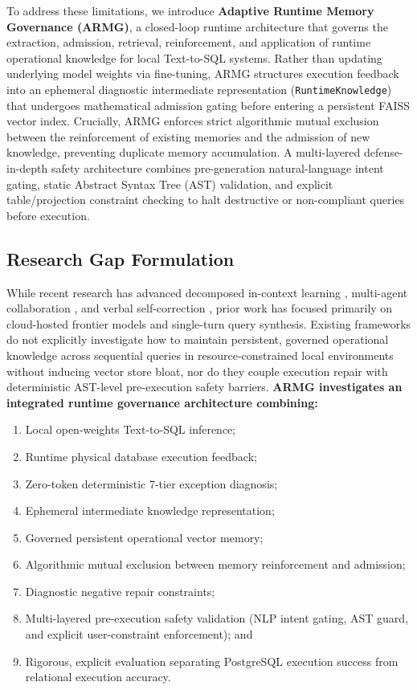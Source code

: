 \documentclass[conference]{IEEEtran}
\begin{document}
To address these limitations, we introduce \textbf{Adaptive Runtime Memory Governance (ARMG)}, a closed-loop runtime architecture that governs the extraction, admission, retrieval, reinforcement, and application of runtime operational knowledge for local Text-to-SQL systems. Rather than updating underlying model weights via fine-tuning, ARMG structures execution feedback into an ephemeral diagnostic intermediate representation (\texttt{RuntimeKnowledge}) that undergoes mathematical admission gating before entering a persistent FAISS vector index. Crucially, ARMG enforces strict algorithmic mutual exclusion between the reinforcement of existing memories and the admission of new knowledge, preventing duplicate memory accumulation. A multi-layered defense-in-depth safety architecture combines pre-generation natural-language intent gating, static Abstract Syntax Tree (AST) validation, and explicit table/projection constraint checking to halt destructive or non-compliant queries before execution.

\subsection{Research Gap Formulation}
While recent research has advanced decomposed in-context learning \cite{pourreza2023dinsql}, multi-agent collaboration \cite{wang2025macsql}, and verbal self-correction \cite{madaan2023selfrefine, shinn2023reflexion}, prior work has focused primarily on cloud-hosted frontier models and single-turn query synthesis. Existing frameworks do not explicitly investigate how to maintain persistent, governed operational knowledge across sequential queries in resource-constrained local environments without inducing vector store bloat, nor do they couple execution repair with deterministic AST-level pre-execution safety barriers. \textbf{ARMG investigates an integrated runtime governance architecture combining:}
\begin{enumerate}
    \item Local open-weights Text-to-SQL inference;
    \item Runtime physical database execution feedback;
    \item Zero-token deterministic 7-tier exception diagnosis;
    \item Ephemeral intermediate knowledge representation;
    \item Governed persistent operational vector memory;
    \item Algorithmic mutual exclusion between memory reinforcement and admission;
    \item Diagnostic negative repair constraints;
    \item Multi-layered pre-execution safety validation (NLP intent gating, AST guard, and explicit user-constraint enforcement); and
    \item Rigorous, explicit evaluation separating PostgreSQL execution success from relational execution accuracy.
\end{enumerate}
\end{document}
